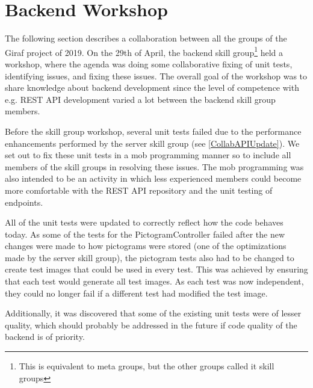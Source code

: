 \section{Backend Workshop} \label{SEC:workshopAPIcollab}
The following section describes a collaboration between all the groups of the Giraf project of 2019. 
On the 29th of April, the backend skill group\footnote{This is equivalent to meta groups, but the other groups called it skill groups} held a workshop, where the agenda was doing some collaborative fixing of unit tests, identifying issues, and fixing these issues. 
The overall goal of the workshop was to share knowledge about backend development since the level of competence with e.g. REST API development varied a lot between the backend skill group members.

Before the skill group workshop, several unit tests failed due to the performance enhancements performed by the server skill group (see \autoref{CollabAPIUpdate}). 
We set out to fix these unit tests in a mob programming manner so to include all members of the skill groups in resolving these issues.
The mob programming was also intended to be an activity in which less experienced members could become more comfortable with the REST API repository and the unit testing of endpoints.

All of the unit tests were updated to correctly reflect how the code behaves today.
As some of the tests for the PictogramController failed after the new changes were made to how pictograms were stored (one of the optimizations made by the server skill group), the pictogram tests also had to be changed to create test images that could be used in every test.
This was achieved by ensuring that each test would generate all test images.
As each test was now independent, they could no longer fail if a different test had modified the test image.

Additionally, it was discovered that some of the existing unit tests were of lesser quality, which should probably be addressed in the future if code quality of the backend is of priority.

